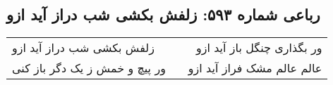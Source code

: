 \begin{center}
\section*{رباعی شماره ۵۹۳: زلفش بکشی شب دراز آید ازو}
\label{sec:sh593}
\begin{longtable}{l p{0.5cm} r}
زلفش بکشی شب دراز آید ازو
&&
ور بگذاری چنگل باز آید ازو
\\
ور پیچ و خمش ز یک دگر باز کنی
&&
عالم عالم مشک فراز آید ازو
\\
\end{longtable}
\end{center}
